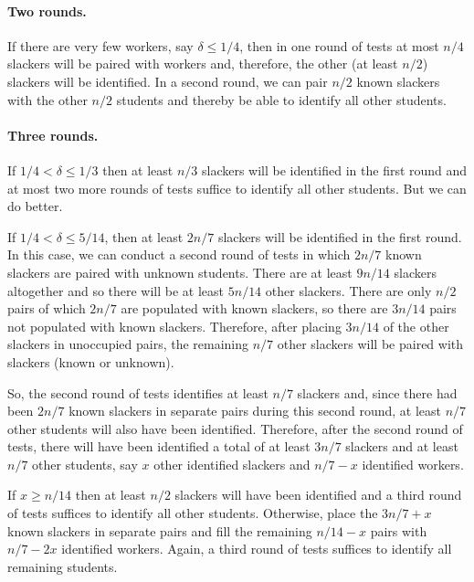 \documentclass[11pt]{llncs}
\renewcommand{\subsection}[1]{\paragraph{\bf #1.}}
\begin{document}
\subsection{Two rounds}
If there are very few workers, say $\delta \leq 1/4$, then in one round of tests
at most $n/4$ slackers will be paired with workers and, therefore, the other
(at least $n/2$) slackers will be identified.  In a second round, we can pair
$n/2$ known slackers with the other $n/2$ students and thereby be able to identify
all other students.

\subsection{Three rounds}
If $1/4 < \delta \leq 1/3$ then at least $n/3$ slackers will be
identified in the first round and at most two more rounds of tests suffice to
identify all other students.  But we can do better.

If $1/4 < \delta \leq 5/14$, then at least $2n/7$ slackers will be
identified in the first round.
In this case, we can
conduct a second round of tests in which $2n/7$ known slackers are paired with unknown
students.
There are at least $9n/14$ slackers altogether
and so there will be at least $5n/14$ other slackers.
There are only $n/2$ pairs of which $2n/7$ are populated with known slackers,
so there are $3n/14$ pairs not populated with known slackers.
Therefore, after placing $3n/14$ of the other slackers in unoccupied pairs,
the remaining $n/7$ other slackers will be paired with slackers (known or unknown).

So, the second round of tests identifies at least $n/7$ slackers and,
since there had been $2n/7$ known slackers in separate pairs during this second round,
at least $n/7$ other students will also have been identified.
Therefore, after the second round of tests, there will have been identified
a total of at least $3n/7$ slackers and at least $n/7$ other students,
say $x$ other identified slackers and $n/7 -x$ identified workers.

If $x\geq n/14$ then at least $n/2$ slackers will have been identified and
a third round of tests suffices to identify all other students.
Otherwise, place the $3n/7+x$ known slackers in separate pairs and fill the remaining
$n/14-x$ pairs with $n/7-2x$ identified workers.
Again, a third round of tests suffices to identify all remaining students.
\end{document}
